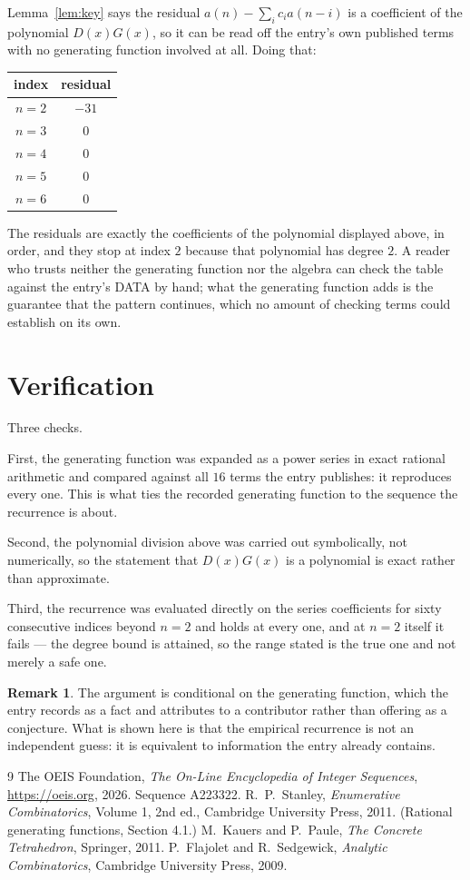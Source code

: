 \documentclass[11pt,a4paper]{article}
\theoremstyle{plain}
\theoremstyle{definition}
\newtheorem{remark}[theorem]{Remark}
\begin{document}
Lemma~\ref{lem:key} says the residual $a(n)-\sum_ic_ia(n-i)$ is a coefficient of the
polynomial $D(x)G(x)$, so it can be read off the entry's own published terms with no
generating function involved at all. Doing that:
\begin{center}
\begin{tabular}{cc}
index & residual \\ \hline
$n=2$ & $-31$ \\
$n=3$ & $0$ \\
$n=4$ & $0$ \\
$n=5$ & $0$ \\
$n=6$ & $0$
\end{tabular}
\end{center}
The residuals are exactly the coefficients of the polynomial displayed above, in order, and
they stop at index $2$ because that polynomial has degree $2$. A reader who trusts
neither the generating function nor the algebra can check the table against the entry's DATA
by hand; what the generating function adds is the guarantee that the pattern continues, which
no amount of checking terms could establish on its own.

\section{Verification}

Three checks.

First, the generating function was expanded as a power series in exact rational arithmetic and
compared against all $16$ terms the entry publishes: it reproduces every one. This is
what ties the recorded generating function to the sequence the recurrence is about.

Second, the polynomial division above was carried out symbolically, not numerically, so the
statement that $D(x)G(x)$ is a polynomial is exact rather than approximate.

Third, the recurrence was evaluated directly on the series coefficients for sixty consecutive
indices beyond $n=2$ and holds at every one, and at $n=2$ itself it fails --- the
degree bound is attained, so the range stated is the true one and not merely a safe one.

\begin{remark}
The argument is conditional on the generating function, which the entry records as a fact and
attributes to a contributor rather than offering as a conjecture. What is shown here is that
the empirical recurrence is not an independent guess: it is equivalent to information the
entry already contains.
\end{remark}

\begin{thebibliography}{9}
 The OEIS Foundation, \emph{The On-Line Encyclopedia of Integer
Sequences}, \url{https://oeis.org}, 2026. Sequence A223322.
 R.~P.~Stanley, \emph{Enumerative Combinatorics}, Volume 1, 2nd ed.,
Cambridge University Press, 2011. (Rational generating functions, Section 4.1.)
 M.~Kauers and P.~Paule, \emph{The Concrete Tetrahedron}, Springer, 2011.
 P.~Flajolet and R.~Sedgewick, \emph{Analytic Combinatorics}, Cambridge
University Press, 2009.
\end{thebibliography}
\end{document}
